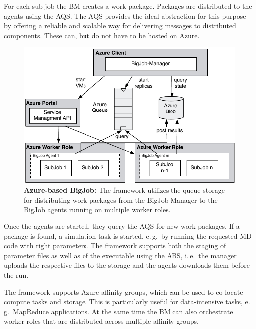\documentclass[conference,final]{IEEEtran}
\newcommand{\up}{\vspace*{-1em}}
\newcommand{\alnote}[1]{ {\textcolor{blue} { ***AL: #1 }}}
\newcommand{\jhanote}[1]{ {\textcolor{red} { ***SJ: #1 }}}
\newcommand{\alnote}[1]{}
\newcommand{\jhanote}[1]{}
\begin{document}
For each sub-job the BM creates a work package. Packages are
distributed to the agents using the AQS. The AQS provides the ideal
abstraction for this purpose by offering a reliable and scalable way
for delivering messages to distributed components. These can, but do
not have to be hosted on Azure.


\begin{figure}
    \centering
    \includegraphics[width=.4\textwidth]{figures/bigjob_azure}
    \caption{\textbf{Azure-based BigJob:} The framework
      utilizes the queue storage for distributing work
      packages from the BigJob Manager to the
      BigJob agents running on multiple worker roles.}
    \label{fig:figures_bigjob_azure}
    \up\up
\end{figure}

Once the agents are started, they query the AQS for new work
packages.  If a package is found, a simulation task is started, e.\,g.\
by running the requested MD code with right parameters. The framework
supports both the staging of parameter files as well as of the
executable using the ABS, i.\,e.\ the manager
uploads the respective files to the storage and the agents downloads
them before the run.

The framework supports Azure affinity groups, which
can be used to co-locate compute tasks and storage. This is
particularly useful for data-intensive tasks, e.\,g.\ MapReduce
applications. At the same time the BM can also orchestrate worker roles that
are distributed across multiple affinity groups.


\end{document}
